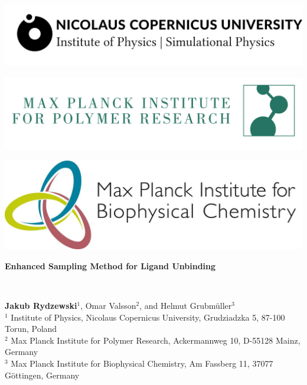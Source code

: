 \documentclass[a0,portrait]{a0poster}
\begin{document}
\begin{minipage}[b]{0.3\linewidth}
\centering
\includegraphics[width=25cm]{../fig/umk.png}
\end{minipage}\hspace*{4cm}
\begin{minipage}[b]{0.3\linewidth}
\centering
\includegraphics[width=23cm]{../fig/mpip.png}
\end{minipage}\hspace*{3cm}
\begin{minipage}[b]{0.3\linewidth}
\centering
\includegraphics[width=16cm]{../fig/helmut.jpg}
\end{minipage}

\vspace{1cm}

\begin{minipage}[b]{\linewidth}
\veryHuge\centering\color{myblue} 
\begin{minipage}[b]{\linewidth}
\textbf{Enhanced Sampling Method for Ligand Unbinding}
  \end{minipage}
\end{minipage}
\color{Black}\\[1cm]
\begin{minipage}[b]{\linewidth}
  \huge \textbf{Jakub Rydzewski$^1$}, Omar Valsson$^2$, and Helmut
  Grubm\"{u}ller$^3$\\[1cm]
\large $^1$ Institute of Physics, Nicolaus Copernicus University,
  Grudziadzka 5, 87-100 Torun, Poland\\
\large $^2$ Max Planck Institute for Polymer Research, Ackermannweg 10,
  D-55128 Mainz, Germany\\
\large $^3$ Max Planck Institute for Biophysical Chemistry, Am Fassberg 11,
  37077 G\"{o}ttingen, Germany\\
\end{minipage}
\end{document}
